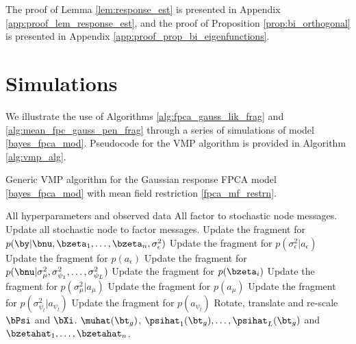\documentclass[12pt]{article}
\def\sigsqeps{\sigma^2_{\epsilon}}
\def\aeps{a_{\epsilon}}
\def\sigsqmu{\sigma^2_{\mu}}
\def\amu{a_{\mu}}
\newcommand\sigsqpsi[1]{\sigma^2_{\psi_{#1}}}
\newcommand\apsi[1]{a_{\psi_{#1}}}
\theoremstyle{plain}
\theoremstyle{definition}
\theoremstyle{remark}
\begin{document}
\noindent The proof of Lemma \ref{lem:response_est} is presented in Appendix \ref{app:proof_lem_response_est},
and the proof of Proposition \ref{prop:bi_orthogonal} is presented in Appendix \ref{app:proof_prop_bi_eigenfunctions}.


\section{Simulations}
\label{sec:sims}

We illustrate the use of Algorithms \ref{alg:fpca_gauss_lik_frag} and \ref{alg:mean_fpc_gauss_pen_frag}
through a series of simulations of model \eqref{bayes_fpca_mod}. Pseudocode for the VMP algorithm is
provided in Algorithm \ref{alg:vmp_alg}.

\begin{algorithm}
	\caption{
		Generic VMP algorithm for the Gaussian response FPCA model \eqref{bayes_fpca_mod} with
		mean field restriction \eqref{fpca_mf_restrn}.
	}
	\label{alg:vmp_alg}
	\begin{algorithmic}[1]
		\Inputs All hyperparameters and observed data
		\Initialize All factor to stochastic node messages.
		\Updates
				\State Update all stochastic node to factor messages.
				\State Update the fragment for $p (\by | \bnu, \bzeta_1, \dots, \bzeta_n, \sigsqeps)$
				\State Update the fragment for $p (\sigsqeps | \aeps)$
				\State Update the fragment for $p (\aeps)$
				\State Update the fragment for $p (\bnu | \sigsqmu, \sigsqpsi{1}, \dots, \sigsqpsi{L})$
					\State Update the fragment for $p (\bzeta_i)$
				\EndFor
				\State Update the fragment for $p (\sigsqmu | \amu)$
				\State Update the fragment for $p (\amu)$
					\State Update the fragment for $p (\sigsqpsi{l} | \apsi{l})$
					\State Update the fragment for $p (\apsi{l})$
				\EndFor
			\EndWhile
			\State Rotate, translate and re-scale $\bPsi$ and $\bXi$.
		\Outputs $\muhat (\bt_g)$, $\psihat_1 (\bt_g), \dots, \psihat_L (\bt_g)$ and $\bzetahat_1, \dots, \bzetahat_n$.
	\end{algorithmic}
\end{algorithm}
\end{document}
